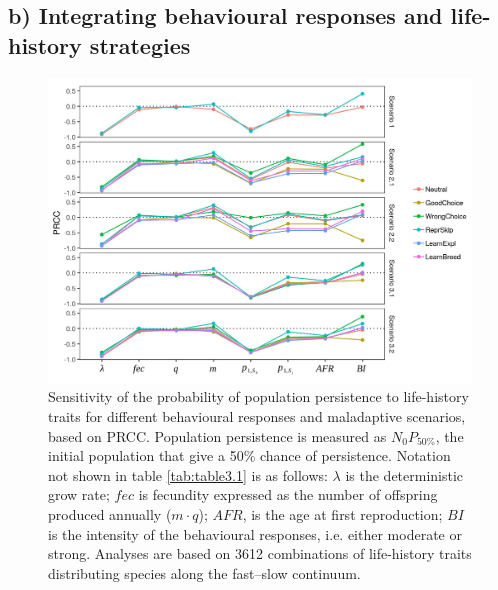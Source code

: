 \subsection*{b) Integrating behavioural responses and life-history strategies}

\begin{figure}
\centering
\includegraphics[width=\textwidth]{./Figures/chapter03/Fig_2.jpg}
\caption[Sensitivity of $N_{0}P_{50\%}$]{
Sensitivity of the probability of population persistence to life-history traits
for different behavioural responses and maladaptive scenarios, based on PRCC.
Population persistence is measured as $N_{0}P_{50\%}$, the initial population
that give a 50\% chance of persistence. Notation not shown in table
\ref{tab:table3.1} is as follows: $\lambda$ is the
deterministic grow rate; $fec$ is fecundity expressed as the number of offspring
produced annually ($m \cdot q$); $AFR$, is the age at first reproduction; $BI$
is the intensity of the behavioural responses, i.e. either moderate or strong.
Analyses are based on 3612 combinations of life-history traits distributing
species along the fast–slow continuum.}
\label{fig:fig3.2}
\end{figure}


